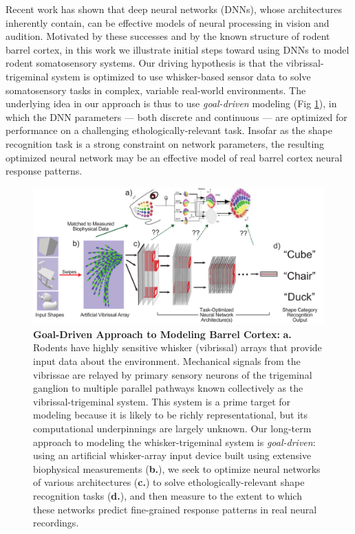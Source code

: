 Recent work has shown that deep neural networks (DNNs), whose architectures inherently contain, can be effective models of neural processing in vision\cite{Yamins2014,khaligh2014deep} and audition\cite{kell_yamins_sfn}.
Motivated by these successes and by the known structure of rodent barrel cortex, in this work we illustrate initial steps toward using DNNs to model rodent somatosensory systems.
Our driving hypothesis is that the vibrissal-trigeminal system is optimized to use whisker-based sensor data to solve somatosensory tasks in complex, variable real-world environments.
The underlying idea in our approach is thus to use \emph{goal-driven} modeling (Fig \ref{fig_schematic}), in which the DNN parameters --- both discrete and continuous --- are optimized for performance on a challenging ethologically-relevant task\cite{yamins2016using}.
Insofar as the shape recognition task is a strong constraint on network parameters, the resulting optimized neural network may be an effective model of real barrel cortex neural response patterns.

\begin{figure}
\centering
\includegraphics [width=1\linewidth]{figures/schematic.pdf}
\vspace{-3mm}
\caption{\footnotesize{\textbf{Goal-Driven Approach to Modeling Barrel Cortex:} \textbf{a.} Rodents have highly sensitive whisker (vibrissal) arrays that provide input data about the environment. Mechanical signals from the vibrissae are relayed by primary sensory neurons of the trigeminal ganglion to multiple parallel pathways known collectively as the vibrissal-trigeminal system.  This system is a prime target for modeling because it is likely to be richly representational, but its computational underpinnings are largely unknown. Our long-term approach to modeling the whisker-trigeminal system is \emph{goal-driven}: using an artificial whisker-array input device built using extensive biophysical measurements (\textbf{b.}), we seek to optimize neural networks of various architectures (\textbf{c.}) to solve ethologically-relevant shape recognition tasks (\textbf{d.}), and then measure to the extent to which these networks predict fine-grained response patterns in real neural recordings.} ~\label{fig_schematic}}
\vspace{-6mm}
\end{figure}

